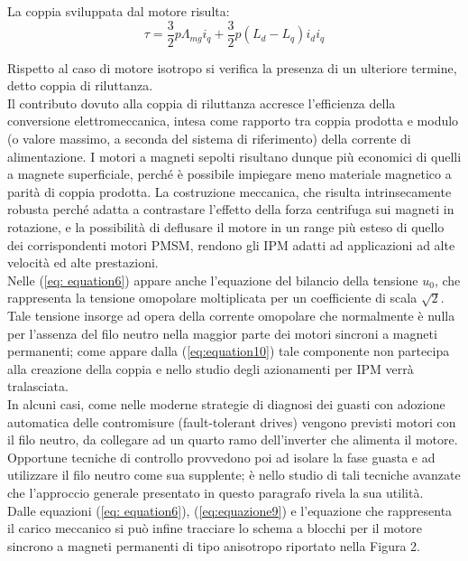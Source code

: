 La coppia sviluppata dal motore risulta:
\begin{equation}
 \tau=\frac{3}{2}p\Lambda_{mg}i_q+\frac{3}{2}p(L_d-L_q)i_di_q
 \label{eq:equazione9}
\end{equation}

Rispetto al caso di motore isotropo si verifica la presenza di un ulteriore
termine, detto coppia di riluttanza.\\
Il contributo dovuto alla coppia di riluttanza accresce l’efficienza della conversione
elettromeccanica, intesa come rapporto tra coppia prodotta e modulo
(o valore massimo, a seconda del sistema di riferimento) della corrente di alimentazione.
I motori a magneti sepolti risultano dunque più economici di quelli a
magnete superficiale, perché è possibile impiegare meno materiale magnetico a
parità di coppia prodotta. La costruzione meccanica, che risulta intrinsecamente
robusta perché adatta a contrastare l’effetto della forza centrifuga sui magneti in
rotazione, e la possibilità di deflusare il motore in un range più esteso di quello
dei corrispondenti motori PMSM, rendono gli IPM adatti ad applicazioni ad
alte velocità ed alte prestazioni.\\
Nelle (\ref{eq: equation6}) appare anche l’equazione del bilancio della tensione $u_0$, che rappresenta
la tensione omopolare moltiplicata per un coefficiente di scala
$\sqrt{2}$. Tale
tensione insorge ad opera della corrente omopolare che normalmente è nulla
per l’assenza del filo neutro nella maggior parte dei motori sincroni a magneti
permanenti; come appare dalla (\ref{eq:equation10}) tale componente non partecipa alla creazione
della coppia e nello studio degli azionamenti per IPM verrà tralasciata.\\
In alcuni casi, come nelle moderne strategie di diagnosi dei guasti con adozione
automatica delle contromisure (fault-tolerant drives) vengono previsti
motori con il filo neutro, da collegare ad un quarto ramo dell’inverter che alimenta
il motore. Opportune tecniche di controllo provvedono poi ad isolare la
fase guasta e ad utilizzare il filo neutro come sua supplente; è nello studio di tali
tecniche avanzate che l’approccio generale presentato in questo paragrafo rivela
la sua utilità.\\
Dalle equazioni (\ref{eq: equation6}), (\ref{eq:equazione9}) e l’equazione che rappresenta il carico meccanico
si può infine tracciare lo schema a blocchi per il motore sincrono a magneti
permanenti di tipo anisotropo riportato nella Figura 2.

